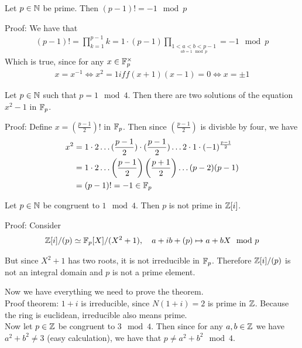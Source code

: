 \begin{lemma}[]
	Let $p \in \mathbb{N}$ be prime. Then $(p-1)! = -1 \mod p$
\end{lemma}
Proof: We have that 
\begin{align*}
	(p-1)! = \prod_{k=1}^{p-1}k	= 1 \cdot (p-1) \prod_{\underset{ab = 1 \mod p}{1 < a < b < p-1}} = -1 \mod p
\end{align*}
Which is true, since for any $x \in \mathbb{F}_p^{\times}$ 
\begin{align*}
	x = x^{-1} \iff x^2 = 1 iff	 (x+1)(x-1) = 0 \iff x = \pm 1 
\end{align*}

\begin{proposition}[]
	Let $p \in \mathbb{N}$ such that $p = 1 \mod 4$. Then there are two solutions of the equation $x^2 - 1$ in $\mathbb{F}_p$.	
\end{proposition}
Proof: Define $x = (\frac{p-1}{2})!$ in $\mathbb{F}_p$. Then since $(\frac{p-1}{2})$ is divisble by four, we have
\begin{align*}
	x^2 &= 1 \cdot 2 \dots (\frac{p-1}{2}) \cdot (\frac{p-1}{2}) \dots 2 \cdot 1 \cdot (-1)^{\frac{p-1}{2}}\\
			&= 1 \cdot 2 \dots \left(\frac{p-1}{2}\right) \left(\frac{p+1}{2}\right) \dots (p-2)(p-1)\\
			&= (p-1)! = -1 \in \mathbb{F}_p
\end{align*}

\begin{corollary}[]
	Let $p \in \mathbb{N}$ be congruent to $1 \mod 4$. Then $p$ is not prime in $\mathbb{Z}[i]$.
\end{corollary}
Proof: Consider
\begin{align*}
	\mathbb{Z}[i]/(p) \simeq \mathbb{F}_p[X]/(X^2+1), \quad a + ib + (p) \mapsto a +bX \mod p
\end{align*}

But since $X^2 + 1$ has two roots, it is not irreducible in $\mathbb{F}_p$. Therefore $\mathbb{Z}[i]/(p)$ is not an integral domain and $p$ is not a prime element.

Now we have everything we need to prove the theorem.\\

Proof theorem: $1 + i$ is irreducible, since $N(1+i) = 2$ is prime in $\mathbb{Z}$. Because the ring is euclidean, irreducible also means prime.\\
Now let $p \in \mathbb{Z}$ be congruent to $3 \mod 4$. Then since for any $a,b \in \mathbb{Z}$ we have $a^2 + b^2 \neq 3$ (easy calculation), we have that $p \neq a^2 + b^2 \mod 4$.\\

